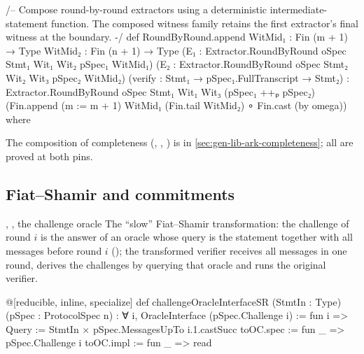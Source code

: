 \begin{leancode}
/-- Compose round-by-round extractors using a deterministic intermediate-statement function.
The composed witness family retains the first extractor's final witness at the boundary. -/
def RoundByRound.append
    {WitMid₁ : Fin (m + 1) → Type} {WitMid₂ : Fin (n + 1) → Type}
    (E₁ : Extractor.RoundByRound oSpec Stmt₁ Wit₁ Wit₂ pSpec₁ WitMid₁)
    (E₂ : Extractor.RoundByRound oSpec Stmt₂ Wit₂ Wit₃ pSpec₂ WitMid₂)
    (verify : Stmt₁ → pSpec₁.FullTranscript → Stmt₂) :
      Extractor.RoundByRound oSpec Stmt₁ Wit₁ Wit₃ (pSpec₁ ++ₚ pSpec₂)
        (Fin.append (m := m + 1) WitMid₁ (Fin.tail WitMid₂) ∘ Fin.cast (by omega)) where
\end{leancode}


The composition of completeness (\allowbreak{}\allowbreak{}\allowbreak{},
\allowbreak{}\allowbreak{}\allowbreak{}, ) is in
\cref{sec:gen-lib-ark-completeness}; all are proved at both pins.

\subsection{Fiat--Shamir and commitments}\label{sec:gen-lib-ark-fs}

\begin{define}{, , the challenge oracle}
The \enquote{slow} Fiat--Shamir transformation: the challenge of round $i$ is the answer of an
oracle whose query is the statement together with all messages before round $i$
(); the transformed verifier receives all messages in one round,
derives the challenges by querying that oracle and runs the original verifier.
\end{define}

\begin{leancode}
@[reducible, inline, specialize]
def challengeOracleInterfaceSR (StmtIn : Type) (pSpec : ProtocolSpec n) :
    ∀ i, OracleInterface (pSpec.Challenge i) := fun i =>
  { Query := StmtIn × pSpec.MessagesUpTo i.1.castSucc
    toOC.spec := fun _ => pSpec.Challenge i
    toOC.impl := fun _ => read }
\end{leancode}

